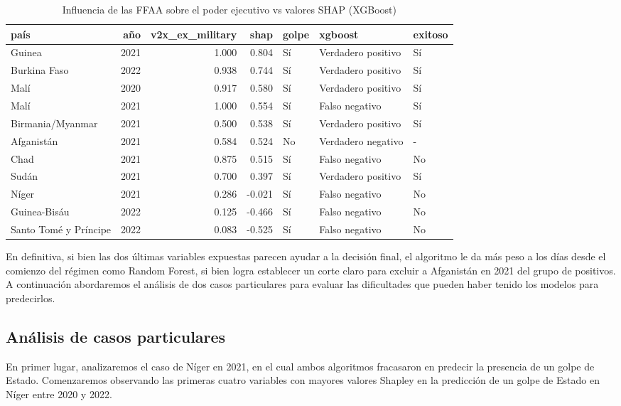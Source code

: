 \documentclass{article}
\begin{document}
\begin{table}[H]
  \centering
   \begin{tabular}{lrrrlll}
    \toprule
    país & año & v2x\_ex\_military & shap & golpe & xgboost & exitoso \\
    \midrule
    Guinea & 2021 & 1.000 & 0.804 & Sí & Verdadero positivo & Sí \\
    Burkina Faso & 2022 & 0.938 & 0.744 & Sí & Verdadero positivo & Sí \\
    Malí & 2020 & 0.917 & 0.580 & Sí & Verdadero positivo & Sí \\
    Malí & 2021 & 1.000 & 0.554 & Sí & Falso negativo & Sí \\
    Birmania/Myanmar & 2021 & 0.500 & 0.538 & Sí & Verdadero positivo & Sí \\
    Afganistán & 2021 & 0.584 & 0.524 & No & Verdadero negativo & - \\
    Chad & 2021 & 0.875 & 0.515 & Sí & Falso negativo & No \\
    Sudán & 2021 & 0.700 & 0.397 & Sí & Verdadero positivo & Sí \\
    Níger & 2021 & 0.286 & -0.021 & Sí & Falso negativo & No \\
    Guinea-Bisáu & 2022 & 0.125 & -0.466 & Sí & Falso negativo & No \\
    Santo Tomé y Príncipe & 2022 & 0.083 & -0.525 & Sí & Falso negativo & No \\
    \bottomrule
   \end{tabular}
  \caption{Influencia de las FFAA sobre el poder ejecutivo vs valores SHAP (XGBoost) \label{tab:shap_xgb_exmil}}
 \end{table}

En definitiva, si bien las dos últimas variables expuestas parecen ayudar a la decisión final, el 
algoritmo le da más peso a los días desde el comienzo del régimen como Random Forest, si bien logra
establecer un corte claro para excluir a Afganistán en 2021 del grupo de positivos. A continuación
abordaremos el análisis de dos casos particulares para evaluar las dificultades que pueden haber
tenido los modelos para predecirlos.

\subsection{Análisis de casos particulares}

En primer lugar, analizaremos el caso de Níger en 2021, en el cual ambos algoritmos fracasaron en 
predecir la presencia de un golpe de Estado. Comenzaremos observando las primeras cuatro variables
con mayores valores Shapley en la predicción de un golpe de Estado en Níger entre 2020 y 2022.
\end{document}
